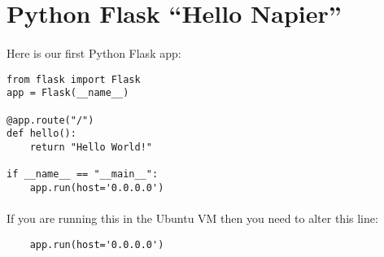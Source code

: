 \documentclass[12pt, a4paper, twoside]{book}
\begin{document}

\section{Python Flask ``Hello Napier''}
\label{hello-napier}
\paragraph{} Here is our first Python Flask app:

\begin{lstlisting}
from flask import Flask
app = Flask(__name__)

@app.route("/")
def hello():
    return "Hello World!"

if __name__ == "__main__":
    app.run(host='0.0.0.0')
\end{lstlisting}

\paragraph{} If you are running this in the Ubuntu VM then you need to alter this line:
\begin{lstlisting}
    app.run(host='0.0.0.0')
\end{lstlisting}
\end{document}
